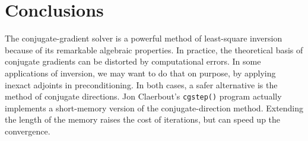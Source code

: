 

\begin{comment}
\subsection{Example 3: Leveled inverse interpolation}
The third example is the linearized nonlinear inversion for
interpolating the SeaBeam dataset \cite[]{gee,Crawley.sep.84.279}. This
interpolation problem is nonlinear because the pre\-dic\-tion-error
fil\-ter is esti\-mated simul\-ta\-neously with the missing data. The
conjugate-gradient solver showed a very slow convergence in this case.
Figure \ref{fig:dirjbm} compares the results of the conjugate-gradient
and conjugate-direction methods after 2500 iterations. Because of the
large scale of the problem, I set \verb!niter=4! in the
\verb!cdstep()!  program, storing only the three preceding steps of
the conjugate-direction optimization. The acceleration of convergence
produced a noticeably better interpolation, which is visible in the
figure.

\end{comment} 

\section{Conclusions}

The conjugate-gradient solver is a powerful method of least-square
inversion because of its remarkable algebraic properties. In practice,
the theoretical basis of conjugate gradients can be distorted by
computational errors. In some applications of inversion, we may want
to do that on purpose, by applying inexact adjoints in
preconditioning.  In both cases, a safer alternative is the method of
conjugate directions. Jon Claerbout's \verb!cgstep()! program actually
implements a short-memory version of the conjugate-direction method.
Extending the length of the memory raises the cost of iterations, but
can speed up the convergence.



